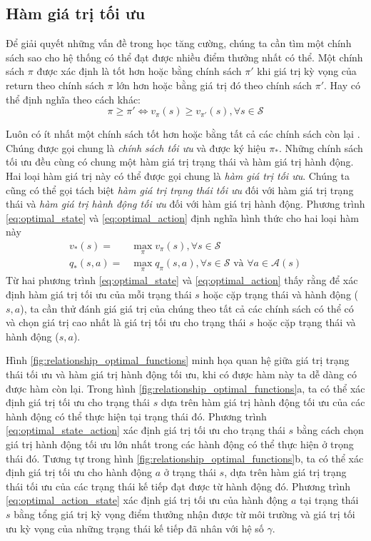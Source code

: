 \subsection{Hàm giá trị tối ưu}
Để giải quyết những vấn đề trong học tăng cường, chúng ta cần tìm một chính sách sao cho hệ thống có thể đạt được nhiều điểm thưởng nhất có thể. Một chính sách $\pi$ được xác định là tốt hơn hoặc bằng chính sách $\pi'$ khi giá trị kỳ vọng của return theo chính sách $\pi$ lớn hơn hoặc bằng giá trị đó theo chính sách $\pi'$. Hay có thể định nghĩa theo cách khác:
\begin{equation}
\pi \geq \pi' \Longleftrightarrow v_{\pi}(s) \geq v_{\pi'}(s), \forall s \in \mathcal{S}
\end{equation}

Luôn có ít nhất một chính sách tốt hơn hoặc bằng tất cả các chính sách còn lại \cite{sutton1998introduction}. Chúng được gọi chung là \textit{chính sách tối ưu} và được ký hiệu $\pi_{*}$. Những chính sách tối ưu đều cùng có chung một hàm giá trị trạng thái và hàm giá trị hành động. Hai loại hàm giá trị này có thể được gọi chung là \textit{hàm giá trị tối ưu}. Chúng ta cũng có thể gọi tách biệt \textit{hàm giá trị trạng thái tối ưu} đối với hàm giá trị trạng thái và \textit{hàm giá trị hành động tối ưu} đối với hàm giá trị hành động. Phương trình \ref{eq:optimal_state} và \ref{eq:optimal_action} định nghĩa hình thức cho hai loại hàm này
\begin{align}
v_{*}(s) = {} & \max_{\pi}v_{\pi}(s), \forall s \in \mathcal{S} \label{eq:optimal_state} \\
q_{*}(s,a) = {} & \max_{\pi}q_{\pi}(s,a), \forall s \in \mathcal{S} \text{ và } \forall a \in \mathcal{A}(s) \label{eq:optimal_action}
\end{align}
Từ hai phương trình \ref{eq:optimal_state} và \ref{eq:optimal_action} thấy rằng để xác định hàm giá trị tối ưu của mỗi trạng thái $s$ hoặc cặp trạng thái và hành động ($s,a$), ta cần thử đánh giá giá trị của chúng theo tất cả các chính sách có thể có và chọn giá trị cao nhất là giá trị tối ưu cho trạng thái $s$ hoặc cặp trạng thái và hành động ($s,a$).

Hình \ref{fig:relationship_optimal_functions} minh họa quan hệ giữa giá trị trạng thái tối ưu và hàm giá trị hành động tối ưu, khi có được hàm này ta dễ dàng có được hàm còn lại. Trong hình \ref{fig:relationship_optimal_functions}a, ta có thể xác định giá trị tối ưu cho trạng thái $s$ dựa trên hàm giá trị hành động tối ưu của các hành động có thể thực hiện tại trạng thái đó. Phương trình \ref{eq:optimal_state_action} xác định giá trị tối ưu cho trạng thái $s$ bằng cách chọn giá trị hành động tối ưu lớn nhất trong các hành động có thể thực hiện ở trọng thái đó. Tương tự trong hình \ref{fig:relationship_optimal_functions}b, ta có thể xác định giá trị tối ưu cho hành động $a$ ở trạng thái $s$, dựa trên hàm giá trị trạng thái tối ưu của các trạng thái kế tiếp đạt được từ hành động đó. Phương trình \ref{eq:optimal_action_state} xác định giá trị tối ưu của hành động $a$ tại trạng thái $s$ bằng tổng giá trị kỳ vọng điểm thưởng nhận được từ môi trường và giá trị tối ưu kỳ vọng của những trạng thái kế tiếp đã nhân với hệ số $\gamma$.

